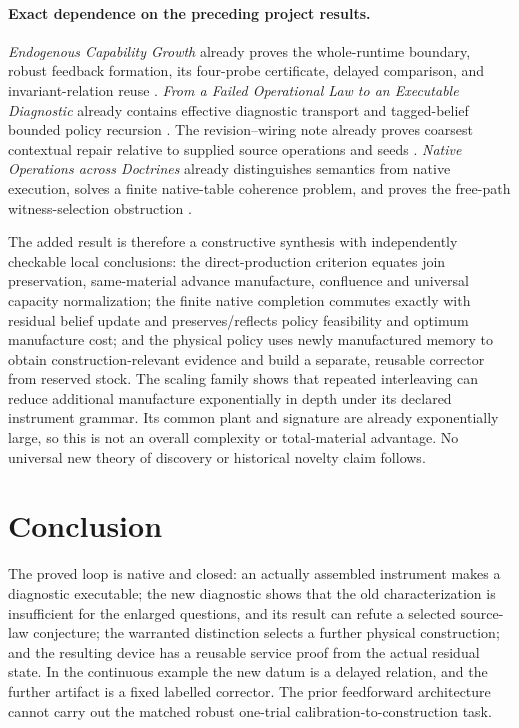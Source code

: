 \documentclass[11pt]{article}
\theoremstyle{definition}
\theoremstyle{remark}
\begin{document}
\paragraph{Exact dependence on the preceding project results.}
\emph{Endogenous Capability Growth} already proves the whole-runtime
boundary, robust feedback formation, its four-probe certificate, delayed
comparison, and invariant-relation reuse \cite{ProjectGrowth}.
\emph{From a Failed Operational Law to an Executable Diagnostic} already
contains effective diagnostic transport and tagged-belief bounded
policy recursion \cite{ProjectDiagnosis}. The revision--wiring note
already proves coarsest contextual repair relative to supplied source
operations and seeds \cite{ProjectRevision}. \emph{Native Operations
across Doctrines} already distinguishes semantics from native execution,
solves a finite native-table coherence problem, and proves the free-path
witness-selection obstruction \cite{ProjectNative}.

The added result is therefore a constructive synthesis with independently
checkable local conclusions: the direct-production criterion equates
join preservation, same-material advance manufacture, confluence and
universal capacity normalization; the finite native completion commutes
exactly with residual belief update and preserves/reflects policy
feasibility and optimum manufacture cost; and the physical policy uses
newly manufactured memory to obtain construction-relevant evidence and
build a separate, reusable corrector from reserved stock. The scaling
family shows that repeated interleaving can reduce additional manufacture
exponentially in depth under its declared instrument grammar. Its common
plant and signature are already exponentially large, so this is not an
overall complexity or total-material advantage. No universal new theory
of discovery or historical novelty claim follows.

\section{Conclusion}\label{sec:conclusion}
The proved loop is native and closed: an actually assembled instrument
makes a diagnostic executable; the new diagnostic shows that the old
characterization is insufficient for the enlarged questions, and its
result can refute a selected source-law conjecture;
the warranted distinction selects a further physical construction; and
the resulting device has a reusable service proof from the actual
residual state. In the continuous example the new datum is a delayed
relation, and the further artifact is a fixed labelled corrector. The
prior feedforward architecture cannot carry out the matched robust
one-trial calibration-to-construction task.
\end{document}
